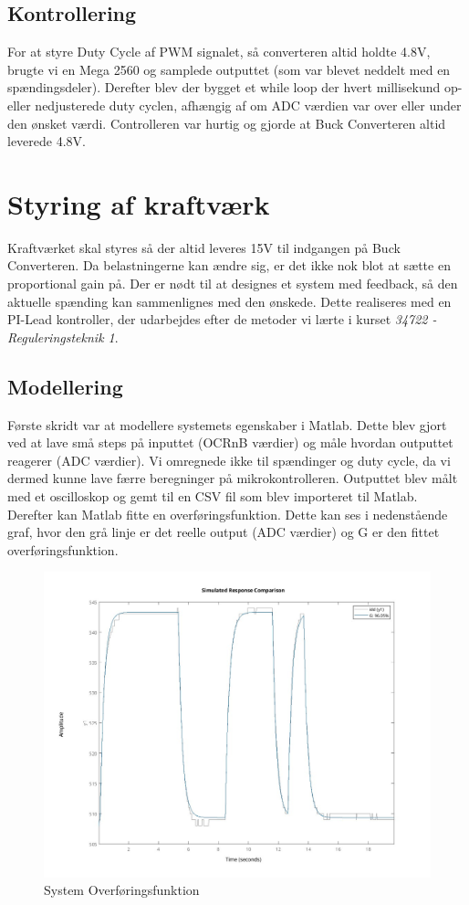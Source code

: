 \documentclass[../main.tex]{subfiles}
\begin{document}
\subsection{Kontrollering}
For at styre Duty Cycle af PWM signalet, så converteren altid holdte 4.8V, brugte vi en Mega 2560 og samplede outputtet (som var blevet neddelt med en spændingsdeler). Derefter blev der bygget et while loop der hvert millisekund op- eller nedjusterede duty cyclen, afhængig af om ADC værdien var over eller under den ønsket værdi. Controlleren var hurtig og gjorde at Buck Converteren altid leverede 4.8V. 

\section{Styring af kraftværk}
Kraftværket skal styres så der altid leveres 15V til indgangen på Buck Converteren. Da belastningerne kan ændre sig, er det ikke nok blot at sætte en proportional gain på. Der er nødt til at designes et system med feedback, så den aktuelle spænding kan sammenlignes med den ønskede. Dette realiseres med en PI-Lead kontroller, der udarbejdes efter de metoder vi lærte i kurset \emph{34722 - Reguleringsteknik 1}.

\subsection{Modellering}
Første skridt var at modellere systemets egenskaber i Matlab. Dette blev gjort ved at lave små steps på inputtet (OCRnB værdier) og måle hvordan outputtet reagerer (ADC værdier). Vi omregnede ikke til spændinger og duty cycle, da vi dermed kunne lave færre beregninger på mikrokontrolleren. Outputtet blev målt med et oscilloskop og gemt til en CSV fil som blev importeret til Matlab. Derefter kan Matlab fitte en overføringsfunktion. Dette kan ses i nedenstående graf, hvor den grå linje er det reelle output (ADC værdier) og G er den fittet overføringsfunktion. 

\begin{figure}[H]
      \includegraphics[width=\textwidth]{Dokumentation/Figures/Motor Model Fit.jpg}
     \caption{System Overføringsfunktion}
     \label{fig: System Overføringsfunktion}
     \end{figure}
\end{document}
